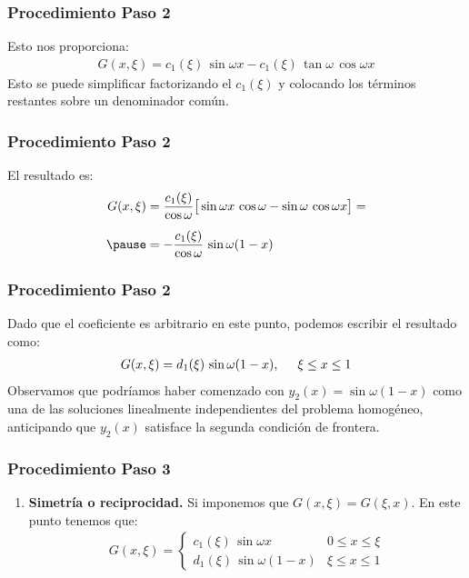 \documentclass[12pt]{beamer}
\begin{document}
\begin{frame}
\frametitle{Procedimiento Paso 2}
Esto nos proporciona:
\pause
\begin{align*}
G (x, \xi) = c_{1} (\xi) \, \sin \omega x - c_{1} (\xi) \, \tan \omega \, \cos \omega x
\end{align*}
\pause
Esto se puede simplificar factorizando el $c_{1} (\xi)$ y colocando los términos restantes sobre un denominador común.
\end{frame}

\begin{frame}
\frametitle{Procedimiento Paso 2}
El resultado es:
\pause
\begin{eqnarray}
\begin{aligned}[b]
G (x, \xi) &= \dfrac{c_{1} (\xi)}{\cos \omega} \big[ \sin \omega x \, \cos \omega - \sin \omega \, \cos \omega x \big] = \\[0.5em] \pause
&= - \dfrac{c_{1} (\xi)}{\cos \omega} \, \sin \omega (1 - x)
\end{aligned}
\label{eq:ecuaction_07_38}
\end{eqnarray}
\end{frame}

\begin{frame}
\frametitle{Procedimiento Paso 2}
Dado que el coeficiente es arbitrario en este punto, podemos escribir el resultado como:
\pause
\begin{align*}
G (x, \xi) = d_{1} (\xi) \, \sin \omega (1 - x), \hspace{0.5cm} \xi \leq x \leq 1
\end{align*}
\pause
Observamos que podríamos haber comenzado con $y_{2} (x) = \sin \omega (1 - x)$ como una de las soluciones linealmente independientes del problema homogéneo, anticipando que $y_{2} (x)$ satisface la segunda condición de frontera.
\end{frame}

\begin{frame}
\frametitle{Procedimiento Paso 3}
\begin{enumerate}[<+->]
\conti
\item \textbf{Simetría o reciprocidad.}
\pause
Si imponemos que $G (x, \xi) = G (\xi, x)$. \pause En este punto tenemos que:
\pause
\begin{align*}
G (x, \xi) = \begin{cases}
c_{1} (\xi) \, \sin \omega x & 0 \leq x \leq \xi \\[0.5em]
d_{1} (\xi) \, \sin \omega (1 - x) & \xi \leq x \leq 1
\end{cases}
\end{align*}
\seti
\end{enumerate}
\end{frame}
\end{document}
